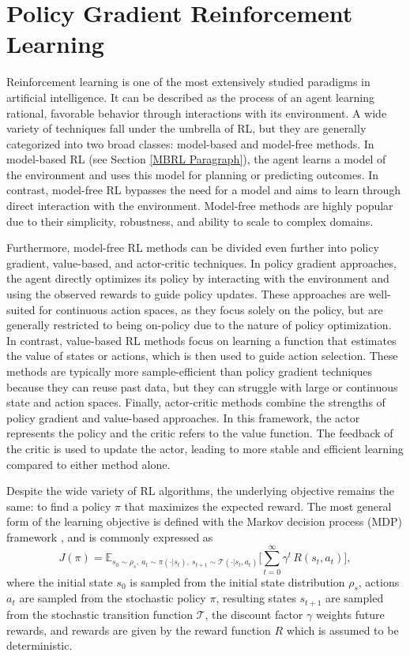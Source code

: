 \documentclass[./dissertation.tex]{subfiles}
\begin{document}
\section{Policy Gradient Reinforcement Learning}
\label{PGRL}
Reinforcement learning \parencite{RL} is one of the most extensively studied paradigms in artificial intelligence. It can be described as the process of an agent learning rational, favorable behavior through interactions with its environment. A wide variety of techniques fall under the umbrella of RL, but they are generally categorized into two broad classes: model-based and model-free methods. In model-based RL (see Section \ref{MBRL Paragraph}), the agent learns a model of the environment and uses this model for planning or predicting outcomes. In contrast, model-free RL bypasses the need for a model and aims to learn through direct interaction with the environment. Model-free methods are highly popular due to their simplicity, robustness, and ability to scale to complex domains.

Furthermore, model-free RL methods can be divided even further into policy gradient, value-based, and actor-critic techniques. In policy gradient approaches, the agent directly optimizes its policy by interacting with the environment and using the observed rewards to guide policy updates. These approaches are well-suited for continuous action spaces, as they focus solely on the policy, but are generally restricted to being on-policy due to the nature of policy optimization. In contrast, value-based RL methods focus on learning a function that estimates the value of states or actions, which is then used to guide action selection. These methods are typically more sample-efficient than policy gradient techniques because they can reuse past data, but they can struggle with large or continuous state and action spaces. Finally, actor-critic methods combine the strengths of policy gradient and value-based approaches. In this framework, the actor represents the policy and the critic refers to the value function. The feedback of the critic is used to update the actor, leading to more stable and efficient learning compared to either method alone.

Despite the wide variety of RL algorithms, the underlying objective remains the same: to find a policy $\pi$ that maximizes the expected reward. The most general form of the learning objective is defined with the Markov decision process (MDP) framework \parencite{MDP}, and is commonly expressed as
\begin{equation}
J(\pi) = \mathbb{E}_{s_0 \sim \rho_s, \ a_t \sim \pi(\cdot|s_t), \ s_{t+1} \sim \mathcal{T}(\cdot|s_t,a_t)}
\Bigg[\sum_{t=0}^\infty \gamma^t \, R(s_t,a_t)\Bigg],
\end{equation}
where the initial state $s_0$ is sampled from the initial state distribution $\rho_s$, actions $a_t$ are sampled from the stochastic policy $\pi$, resulting states $s_{t+1}$ are sampled from the stochastic transition function $\mathcal{T}$, the discount factor $\gamma$ weights future rewards, and rewards are given by the reward function $R$ which is assumed to be deterministic.
\end{document}
